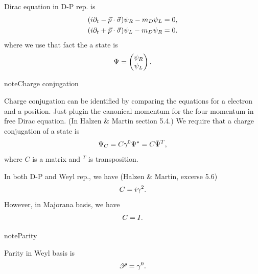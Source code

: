 \documentclass[letterpaper,12pt,english]{sphinxmanual}
\begin{document}
Dirac equation in D-P rep. is
\begin{gather}
\begin{split}(i\partial_t - \vec p \cdot \vec \sigma) \psi_R - m_D\psi_L &= 0, \\
(i\partial_t + \vec p \cdot \vec \sigma) \psi_L - m_D\psi_R &= 0.\end{split}\notag
\end{gather}
where we use that fact the a state is
\begin{gather}
\begin{split}\Psi = \begin{pmatrix}  \psi_R \\ \psi_L \end{pmatrix}.\end{split}\notag
\end{gather}
\begin{notice}{note}{Charge conjugation}

Charge conjugation can be identified by comparing the equations for a electron and a position. Just plugin the canonical momentum for the four momentum in free Dirac equation. (In Halzen \& Martin section 5.4.) We require that a charge conjugation of a state is
\begin{gather}
\begin{split}\Psi_C = C\gamma^0\Psi^* = C \bar\Psi^T,\end{split}\notag
\end{gather}
where \(C\) is a matrix and \({}^T\) is transposition.

In both D-P and Weyl rep., we have (Halzen \& Martin, excerse 5.6)
\begin{gather}
\begin{split}C = i\gamma^2.\end{split}\notag
\end{gather}
However, in Majorana basis, we have
\begin{gather}
\begin{split}C = I.\end{split}\notag
\end{gather}\end{notice}

\begin{notice}{note}{Parity}

Parity in Weyl basis is
\begin{gather}
\begin{split}\mathscr{P} = \gamma^0.\end{split}\notag
\end{gather}\end{notice}
\end{document}

